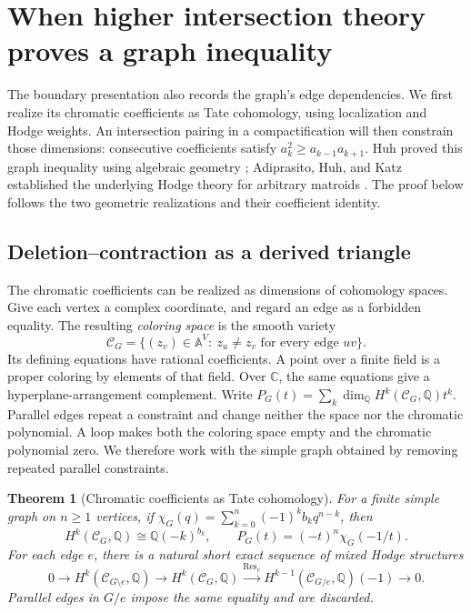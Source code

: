 \documentclass[11pt]{article}
\newtheorem{theorem}{Theorem}[section]
\theoremstyle{definition}
\theoremstyle{remark}
\newcommand{\Q}{\mathbb Q}
\newcommand{\C}{\mathbb C}
\newcommand{\A}{\mathbb A}
\begin{document}
\section{When higher intersection theory proves a graph inequality}
\label{sec:graph-matroid-hodge}

The boundary presentation also records the graph's edge dependencies. We first realize its chromatic coefficients as Tate cohomology, using localization and Hodge weights. An intersection pairing in a compactification will then constrain those dimensions: consecutive coefficients satisfy $a_k^2\ge a_{k-1}a_{k+1}$. Huh proved this graph inequality using algebraic geometry \cite{gmhHuh2012}; Adiprasito, Huh, and Katz established the underlying Hodge theory for arbitrary matroids \cite{gmhAHK2018}. The proof below follows the two geometric realizations and their coefficient identity.

\subsection{Deletion--contraction as a derived triangle}
\label{sec:dag-coloring-space}

The chromatic coefficients can be realized as dimensions of cohomology spaces.
Give each vertex a complex coordinate, and regard an edge as a forbidden
equality. The resulting \emph{coloring space} is the smooth variety
\[
 \mathcal C_G=\{(z_v)\in\A^V:\ z_u\ne z_v\text{ for every edge }uv\}.
\]
Its defining equations have rational coefficients. A point over a finite
field is a proper coloring by elements of that field. Over $\C$, the same
equations give a hyperplane-arrangement complement. Write
$P_G(t)=\sum_k\dim_\Q H^k(\mathcal C_G,\Q)t^k$.
Parallel edges repeat a constraint and change neither the space nor the
chromatic polynomial. A loop makes both the coloring space empty and
the chromatic polynomial zero. We therefore work with the simple graph
obtained by removing repeated parallel constraints.

\begin{theorem}[Chromatic coefficients as Tate cohomology]
\label{thm:dag-chromatic-tate}
For a finite simple graph on $n\ge1$ vertices, if
$\chi_G(q)=\sum_{k=0}^n(-1)^k b_kq^{n-k}$, then
\[
 H^k(\mathcal C_G,\Q)\cong\Q(-k)^{b_k},\qquad
 P_G(t)=(-t)^n\chi_G(-1/t).
\]
For each edge $e$, there is a natural short exact sequence of mixed Hodge
structures
\begin{equation}\label{eq:dag-deletion-restriction}
 0\longrightarrow H^k(\mathcal C_{G\setminus e},\Q)
 \longrightarrow H^k(\mathcal C_G,\Q)
 \xrightarrow{\operatorname{Res}_e}
 H^{k-1}(\mathcal C_{G/e},\Q)(-1)\longrightarrow0.
\end{equation}
Parallel edges in $G/e$ impose the same equality and are discarded.
\end{theorem}
\end{document}
